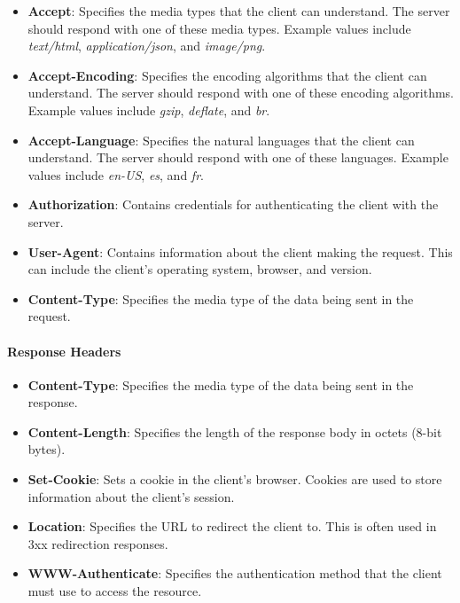 \documentclass[a4paper]{article}
\begin{document}
        \begin{itemize}
            \item \textbf{Accept}: Specifies the media types that the client can understand. The server should respond with one of these media types. Example values include \textit{text/html}, \textit{application/json}, and \textit{image/png}.
            \item \textbf{Accept-Encoding}: Specifies the encoding algorithms that the client can understand. The server should respond with one of these encoding algorithms. Example values include \textit{gzip}, \textit{deflate}, and \textit{br}.
            \item \textbf{Accept-Language}: Specifies the natural languages that the client can understand. The server should respond with one of these languages. Example values include \textit{en-US}, \textit{es}, and \textit{fr}.
            \item \textbf{Authorization}: Contains credentials for authenticating the client with the server.
            \item \textbf{User-Agent}: Contains information about the client making the request. This can include the client's operating system, browser, and version.
            \item \textbf{Content-Type}: Specifies the media type of the data being sent in the request.
        \end{itemize}

        \paragraph{Response Headers}

        \begin{itemize}
            \item \textbf{Content-Type}: Specifies the media type of the data being sent in the response.
            \item \textbf{Content-Length}: Specifies the length of the response body in octets (8-bit bytes).
            \item \textbf{Set-Cookie}: Sets a cookie in the client's browser. Cookies are used to store information about the client's session.
            \item \textbf{Location}: Specifies the URL to redirect the client to. This is often used in 3xx redirection responses.
            \item \textbf{WWW-Authenticate}: Specifies the authentication method that the client must use to access the resource.
        \end{itemize}
\end{document}
